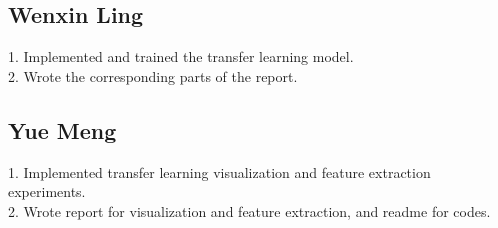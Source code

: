 \subsection{Wenxin Ling}
1. Implemented and trained the transfer learning model.\\
2. Wrote the corresponding parts of the report. 

\subsection{Yue Meng}
1. Implemented transfer learning visualization and feature extraction experiments.\\
2. Wrote report for visualization and feature extraction, and readme for codes.